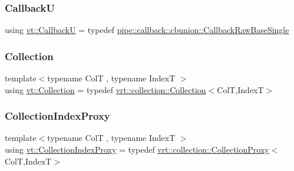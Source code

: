 \mbox{\label{namespacevt_af79a43a97bc3593fc349f086c874c48e}} 
\subsubsection{\texorpdfstring{CallbackU}{CallbackU}}
{\footnotesize\ttfamily using \hyperlink{namespacevt_af79a43a97bc3593fc349f086c874c48e}{vt\+::\+CallbackU} = typedef \hyperlink{structvt_1_1pipe_1_1callback_1_1cbunion_1_1_callback_raw_base_single}{pipe\+::callback\+::cbunion\+::\+Callback\+Raw\+Base\+Single}}

\mbox{\label{namespacevt_ac72e048964e4bb536faaa8bc90f58db7}} 
\subsubsection{\texorpdfstring{Collection}{Collection}}
{\footnotesize\ttfamily template$<$typename ColT , typename IndexT $>$ \\
using \hyperlink{namespacevt_ac72e048964e4bb536faaa8bc90f58db7}{vt\+::\+Collection} = typedef \hyperlink{structvt_1_1vrt_1_1collection_1_1_collection}{vrt\+::collection\+::\+Collection}$<$ColT,IndexT$>$}

\mbox{\label{namespacevt_a2be17f5dafb626fe9f58d762b6aad2f0}} 
\subsubsection{\texorpdfstring{Collection\+Index\+Proxy}{CollectionIndexProxy}}
{\footnotesize\ttfamily template$<$typename ColT , typename IndexT $>$ \\
using \hyperlink{namespacevt_a2be17f5dafb626fe9f58d762b6aad2f0}{vt\+::\+Collection\+Index\+Proxy} = typedef \hyperlink{structvt_1_1vrt_1_1collection_1_1_collection_proxy}{vrt\+::collection\+::\+Collection\+Proxy}$<$ColT,IndexT$>$}

\mbox{\label{namespacevt_a290f7e8941f9f411b54cdb15b6cea107}} 

